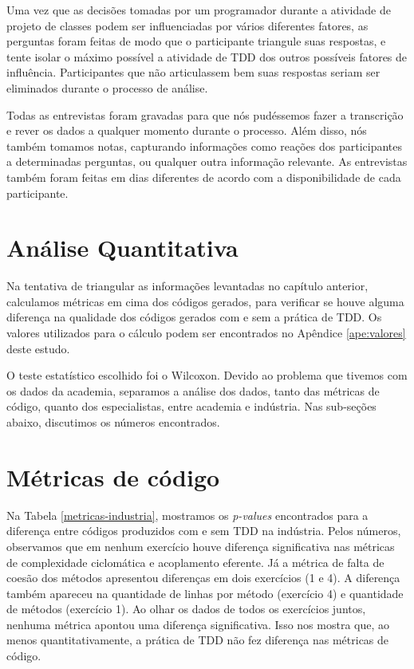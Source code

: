 \documentclass[conference]{IEEEtran}
\begin{document}
Uma vez que as decisões tomadas por um programador durante a atividade de projeto de classes
podem ser influenciadas por vários diferentes fatores, 
as perguntas foram feitas de modo que o participante triangule suas respostas,
e tente isolar o máximo possível a atividade de TDD dos outros possíveis fatores
de influência. Participantes que não articulassem bem suas respostas seriam ser eliminados
durante o processo de análise.

Todas as entrevistas foram gravadas para que nós pudéssemos fazer a
transcrição e rever os dados a qualquer momento durante o processo. Além disso,
nós também tomamos notas, capturando informações como reações dos 
participantes a determinadas perguntas, ou qualquer outra informação relevante. 
As entrevistas também foram feitas em dias diferentes de acordo com a disponibilidade
de cada participante.

\section{Análise Quantitativa}

Na tentativa de triangular as informações levantadas no capítulo anterior,
calculamos métricas em cima dos códigos gerados, para verificar se houve
alguma diferença na qualidade dos códigos gerados com e sem a prática de TDD.
Os valores utilizados para o cálculo podem ser encontrados no Apêndice 
\ref{ape:valores} deste estudo.

O teste estatístico escolhido foi o Wilcoxon. 
Devido ao problema que tivemos com os dados da academia, separamos a análise
dos dados, tanto das métricas de código, quanto dos especialistas, entre academia e indústria.
Nas sub-seções abaixo, discutimos os números encontrados.

\section{Métricas de código}

Na Tabela \ref{metricas-industria}, mostramos os \textit{p-values} encontrados para
a diferença entre códigos produzidos com e sem TDD na indústria. 
Pelos números, 
observamos que em nenhum exercício houve diferença significativa nas métricas
de complexidade ciclomática e acoplamento eferente. Já a métrica de falta
de coesão dos métodos apresentou diferenças em dois exercícios (1 e 4). 
A diferença também apareceu na quantidade de linhas por método (exercício 4)
e quantidade de métodos (exercício 1). Ao olhar os dados de todos os exercícios
juntos, nenhuma métrica apontou uma diferença significativa.
Isso nos mostra que, ao menos quantitativamente, a prática de TDD não fez
diferença nas métricas de código.
\end{document}
